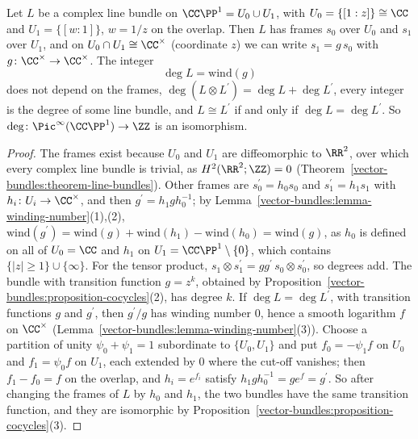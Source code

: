 \begin{proposition}\label{vector-bundles:proposition-line-bundles-sphere}
Let $L$ be a complex line bundle on $\CC\PP^1 = U_0 \cup U_1$, with $U_0 = \{[1 : z]\} \cong \CC$ and $U_1 = \{[w : 1]\}$, $w = 1/z$ on the overlap. Then $L$ has frames $s_0$ over
$U_0$ and $s_1$ over $U_1$, and on $U_0 \cap U_1 \cong \CC^\times$ (coordinate $z$) we can write $s_1 = g\,s_0$ with $g \colon \CC^\times \to \CC^\times$. The integer
\[
\deg L = \mathrm{wind}(g)
\]
does not depend on the frames, $\deg(L \otimes L^{\prime}) = \deg L + \deg L^{\prime}$, every integer is the degree of some line bundle, and $L \cong L^{\prime}$ if and only if
$\deg L = \deg L^{\prime}$. So $\deg \colon \Pic^\infty(\CC\PP^1) \to \ZZ$ is an isomorphism.
\end{proposition}

\begin{proof}
The frames exist because $U_0$ and $U_1$ are diffeomorphic to $\RR^2$, over which every complex line bundle is trivial, as $H^2(\RR^2; \ZZ) = 0$
(Theorem~\ref{vector-bundles:theorem-line-bundles}). Other frames are $s^{\prime}_0 = h_0s_0$ and $s^{\prime}_1 = h_1s_1$ with $h_i \colon U_i \to \CC^\times$, and then
$g^{\prime} = h_1gh_0^{-1}$; by Lemma~\ref{vector-bundles:lemma-winding-number}(1),(2), $\mathrm{wind}(g^{\prime}) = \mathrm{wind}(g) + \mathrm{wind}(h_1) - \mathrm{wind}(h_0) = \mathrm{wind}(g)$, as $h_0$ is
defined on all of $U_0 = \CC$ and $h_1$ on $U_1 = \CC\PP^1 \setminus \{0\}$, which contains $\{|z| \geq 1\} \cup \{\infty\}$. For the tensor product, $s_1 \otimes s^{\prime}_1 = gg^{\prime}\,s_0 \otimes s^{\prime}_0$, so
degrees add. The bundle with transition function $g = z^k$, obtained by Proposition~\ref{vector-bundles:proposition-cocycles}(2), has degree $k$. If $\deg L = \deg L^{\prime}$, with transition
functions $g$ and $g^{\prime}$, then $g^{\prime}/g$ has winding number $0$, hence a smooth logarithm $f$ on $\CC^\times$ (Lemma~\ref{vector-bundles:lemma-winding-number}(3)). Choose a partition of unity
$\psi_0 + \psi_1 = 1$ subordinate to $\{U_0, U_1\}$ and put $f_0 = -\psi_1f$ on $U_0$ and $f_1 = \psi_0f$ on $U_1$, each extended by $0$ where the cut-off vanishes; then $f_1 - f_0 = f$ on the
overlap, and $h_i = e^{f_i}$ satisfy $h_1gh_0^{-1} = ge^{f} = g^{\prime}$. So after changing the frames of $L$ by $h_0$ and $h_1$, the two bundles have the same transition function, and they are
isomorphic by Proposition~\ref{vector-bundles:proposition-cocycles}(3).
\end{proof}

